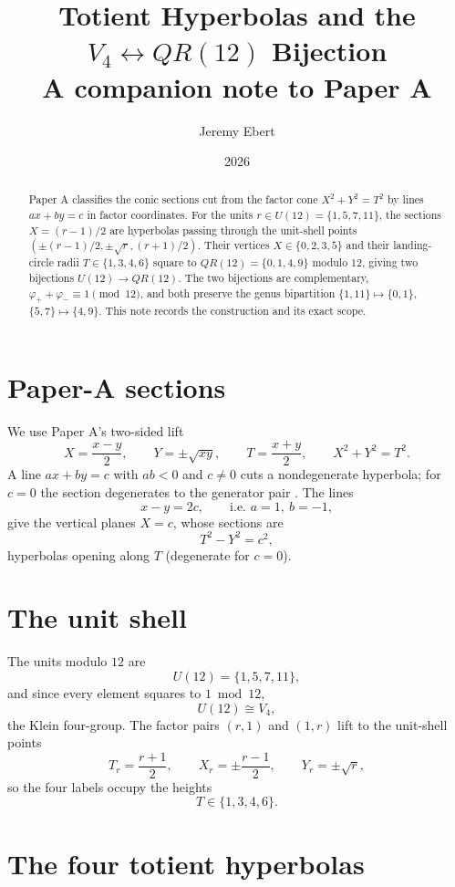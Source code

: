 \documentclass[11pt]{amsart}
\title{Totient Hyperbolas and the $V_4\leftrightarrow QR(12)$ Bijection\\
\large A companion note to Paper A}
\author{Jeremy Ebert}
\date{2026}
\theoremstyle{remark}
\begin{document}
\begin{abstract}
Paper A \cite{Ebert2026Table} classifies the conic sections cut from the
factor cone $X^2+Y^2=T^2$ by lines $ax+by=c$ in factor coordinates.  For
the units $r\in U(12)=\{1,5,7,11\}$, the sections $X=(r-1)/2$ are
hyperbolas passing through the unit-shell points
$(\pm(r-1)/2,\pm\sqrt r,(r+1)/2)$.  Their vertices
$X\in\{0,2,3,5\}$ and their landing-circle radii
$T\in\{1,3,4,6\}$ square to $QR(12)=\{0,1,4,9\}$ modulo $12$, giving two
bijections $U(12)\to QR(12)$.  The two bijections are complementary,
$\varphi_++\varphi_-\equiv 1\pmod{12}$, and both preserve the genus
bipartition $\{1,11\}\mapsto\{0,1\}$, $\{5,7\}\mapsto\{4,9\}$.  This note
records the construction and its exact scope.
\end{abstract}

\maketitle

\section{Paper-A sections}

We use Paper A's two-sided lift
\[
X=\frac{x-y}{2},\qquad Y=\pm\sqrt{xy},\qquad
T=\frac{x+y}{2},\qquad X^2+Y^2=T^2.
\]
A line $ax+by=c$ with $ab<0$ and $c\ne0$ cuts a nondegenerate hyperbola;
for $c=0$ the section degenerates to the generator pair
\cite{Ebert2026Table}.  The lines
\[
x-y=2c,\qquad\text{i.e. }a=1,\ b=-1,
\]
give the vertical planes $X=c$, whose sections are
\[
T^2-Y^2=c^2,
\]
hyperbolas opening along $T$ (degenerate for $c=0$).

\section{The unit shell}

The units modulo $12$ are
\[
U(12)=\{1,5,7,11\},
\]
and since every element squares to $1\bmod 12$,
\[
U(12)\cong V_4,
\]
the Klein four-group.  The factor pairs $(r,1)$ and $(1,r)$ lift to the
unit-shell points
\begin{equation}\label{eq:shell}
T_r=\frac{r+1}{2},\qquad
X_r=\pm\frac{r-1}{2},\qquad
Y_r=\pm\sqrt r,
\end{equation}
so the four labels occupy the heights
\[
T\in\{1,3,4,6\}.
\]

\section{The four totient hyperbolas}
\end{document}
